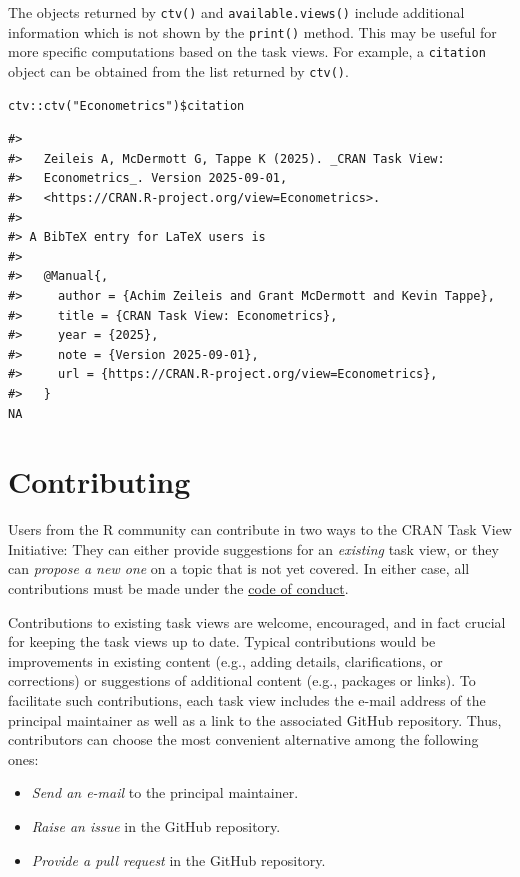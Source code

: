 The objects returned by \texttt{ctv()} and \texttt{available.views()} include additional
information which is not shown by the \texttt{print()} method. This may be useful
for more specific computations based on the task views. For example, a
\texttt{citation} object \citep{bibentry} can be obtained from the list returned by \texttt{ctv()}.

\begin{verbatim}
ctv::ctv("Econometrics")$citation
\end{verbatim}

\begin{verbatim}
#> 
#>   Zeileis A, McDermott G, Tappe K (2025). _CRAN Task View:
#>   Econometrics_. Version 2025-09-01,
#>   <https://CRAN.R-project.org/view=Econometrics>.
#> 
#> A BibTeX entry for LaTeX users is
#> 
#>   @Manual{,
#>     author = {Achim Zeileis and Grant McDermott and Kevin Tappe},
#>     title = {CRAN Task View: Econometrics},
#>     year = {2025},
#>     note = {Version 2025-09-01},
#>     url = {https://CRAN.R-project.org/view=Econometrics},
#>   }
NA
\end{verbatim}

\section{Contributing}\label{sec:contributing}

Users from the R community can contribute in two ways to the CRAN
Task View Initiative: They can either provide suggestions for an \emph{existing}
task view, or they can \emph{propose a new one} on a topic that is not yet covered.
In either case, all contributions must be made under the
\href{https://github.com/cran-task-views/ctv/blob/main/CodeOfConduct.md}{code of conduct}.

Contributions to existing task views are welcome, encouraged, and in fact crucial for
keeping the task views up to date. Typical contributions would be improvements
in existing content (e.g., adding details, clarifications, or corrections) or
suggestions of additional content (e.g., packages or links). To facilitate such
contributions, each task view includes the e-mail address of the principal
maintainer as well as a link to the associated GitHub repository. Thus, contributors
can choose the most convenient alternative among the following ones:

\begin{itemize}
\tightlist
\item
  \emph{Send an e-mail} to the principal maintainer.
\item
  \emph{Raise an issue} in the GitHub repository.
\item
  \emph{Provide a pull request} in the GitHub repository.
\end{itemize}

